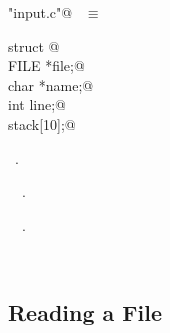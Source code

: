 \documentclass{report}
\begin{document}
\begin{flushleft} \small
\begin{minipage}{\linewidth} \label{scrap138}
\verb@"input.c"@\nobreak\ {\footnotesize {} }$\equiv$
\vspace{-1ex}
\begin{list}{}{} \item
\mbox{}\verb@static struct {@\\
\mbox{}\verb@  FILE *file;@\\
\mbox{}\verb@  char *name;@\\
\mbox{}\verb@  int line;@\\
\mbox{}\verb@} stack[10];@\\
\mbox{}\verb@@{\NWsep}
\end{list}
\vspace{-1ex}
\footnotesize\addtolength{\baselineskip}{-1ex}
\begin{list}{}{\setlength{\itemsep}{-\parsep}\setlength{\itemindent}{-\leftmargin}}
\item \NWtxtFileDefBy\ .
\end{list}
\vspace{-2ex}
\footnotesize\addtolength{\baselineskip}{-1ex}
\begin{list}{}{\setlength{\itemsep}{-\parsep}\setlength{\itemindent}{-\leftmargin}}
\item \NWtxtIdentsDefed\nobreak\  \verb@stack@\nobreak\ .\end{list}
\vspace{-2ex}
\footnotesize\addtolength{\baselineskip}{-1ex}
\begin{list}{}{\setlength{\itemsep}{-\parsep}\setlength{\itemindent}{-\leftmargin}}
\item \NWtxtIdentsUsed\nobreak\  \verb@FILE@\nobreak\ .\end{list}
\end{minipage}\\[4ex]
\end{flushleft}
\subsection{Reading a File}
\end{document}

